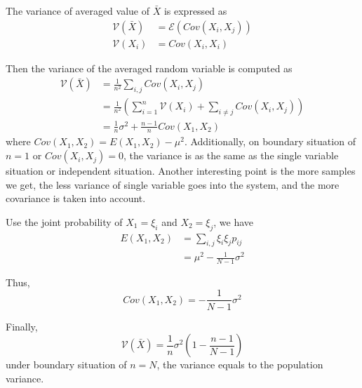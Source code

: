 The variance of averaged value of $\bar{X}$ is expressed as
\begin{align}
    \label{Equation: The Relationship between Variance and Covariance}
    \mathcal{V}(\bar{X}) & = \mathcal{E}(Cov(X_i, X_j)) \\
    \mathcal{V}(X_i)     & = Cov(X_i, X_i)
\end{align}

Then the variance of the averaged random variable is computed as
\begin{align*}
    \mathcal{V}({\bar{X}}) & = \frac{1}{n^2} \sum_{i, j} Cov(X_i, X_j)                                       \\
                           & = \frac{1}{n^2} (\sum_{i=1}^{n}\mathcal{V}(X_i) + \sum_{i \neq j}Cov(X_i, X_j)) \\
                           & = \frac{1}{n} \sigma^2 + \frac{n-1}{n} Cov(X_1, X_2)
\end{align*}
where $Cov(X_1, X_2) = E(X_1, X_2) - \mu^2$.
Additionally, on boundary situation of $n=1$ or $Cov(X_i, X_j)=0$,
the variance is as the same as the single variable situation or independent situation.
Another interesting point is the more samples we get,
the less variance of single variable goes into the system,
and the more covariance is taken into account.

Use the joint probability of $X_1=\xi_i$ and $X_2=\xi_j$, we have
\begin{align*}
    E(X_1, X_2) & = \sum_{i, j} \xi_i \xi_j p_{ij} \\
                & = \mu^2 - \frac{1}{N-1} \sigma^2
\end{align*}

Thus,
\begin{equation*}
    Cov(X_1, X_2) = - \frac{1}{N-1} \sigma^2
\end{equation*}

Finally,
\begin{equation*}
    \mathcal{V}(\bar{X})  = \frac{1}{n} \sigma^2 (1 - \frac{n-1}{N-1})
\end{equation*}
under boundary situation of $n=N$, the variance equals to the population variance.

